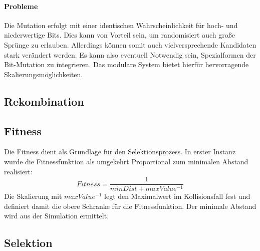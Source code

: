 \documentclass[12pt,a4paper]{scrartcl}
\begin{document}
\paragraph{Probleme} Die Mutation erfolgt mit einer identischen Wahrscheinlichkeit für hoch- und niederwertige Bits. Dies kann von Vorteil sein, um randomisiert auch große Sprünge zu erlauben. Allerdings können somit auch vielversprechende Kandidaten stark verändert werden. Es kann also eventuell Notwendig sein, Spezialformen der Bit-Mutation zu integrieren. Das modulare System bietet hierfür hervorragende Skalierungsmöglichkeiten.

\subsection{Rekombination}

\subsection{Fitness}
Die Fitness dient als Grundlage für den Selektionsprozess. In erster Instanz wurde die Fitnessfunktion als umgekehrt Proportional zum minimalen Abstand realisiert: \[Fitness = \frac{1}{minDist + maxValue^{-1}}\]
Die Skalierung mit $maxValue^{-1}$ legt den Maximalwert im Kollisionsfall fest und definiert damit die obere Schranke für die Fitnessfunktion. Der minimale Abstand wird aus der Simulation ermittelt.

\subsection{Selektion}
\end{document}
